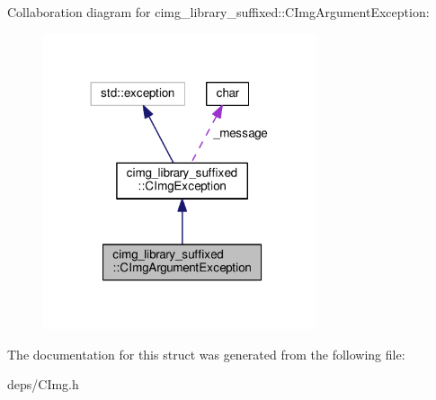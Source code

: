 Collaboration diagram for cimg\+\_\+library\+\_\+suffixed\+:\+:C\+Img\+Argument\+Exception\+:
\nopagebreak
\begin{figure}[H]
\begin{center}
\leavevmode
\includegraphics[width=228pt]{d3/dbd/structcimg__library__suffixed_1_1CImgArgumentException__coll__graph}
\end{center}
\end{figure}


The documentation for this struct was generated from the following file\+:\begin{DoxyCompactItemize}
\item 
deps/C\+Img.\+h\end{DoxyCompactItemize}
